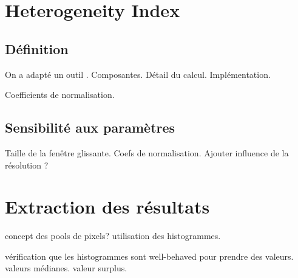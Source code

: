 \section{Heterogeneity Index}
\subsection{Définition}

On a adapté un outil \parencite{liu_2016}.
Composantes.
Détail du calcul.
Implémentation.

Coefficients de normalisation.

\subsection{Sensibilité aux paramètres}

Taille de la fenêtre glissante. Coefs de normalisation.
Ajouter influence de la résolution ?

\section{Extraction des résultats}

concept des pools de pixels?
utilisation des histogrammes.

vérification que les histogrammes sont well-behaved pour prendre des valeurs.
valeurs médianes.
valeur surplus.
